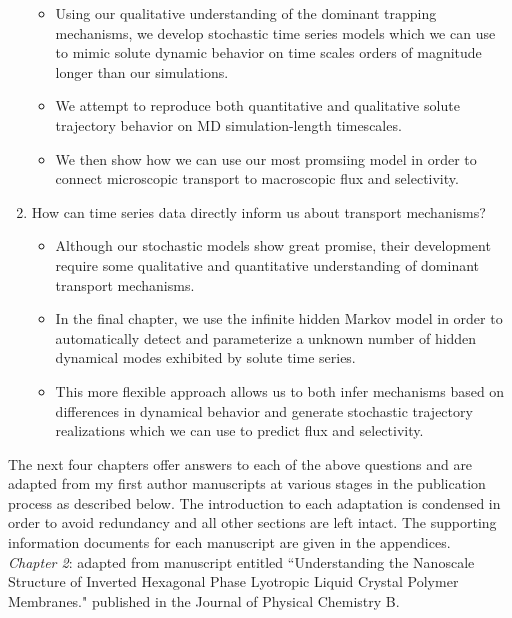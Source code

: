 \begin{enumerate}
\begin{itemize}
    	  \item Using our qualitative understanding of the dominant trapping mechanisms,
    	  we develop stochastic time series models which we can use to mimic solute dynamic
    	  behavior on time scales orders of magnitude longer than our simulations. 
    	  \item We attempt to reproduce both quantitative and qualitative solute trajectory
    	  behavior on MD simulation-length timescales.
    	  \item We then show how we can use our most promsiing model in order to connect 
    	  microscopic transport to macroscopic flux and selectivity.
    	\end{itemize}

    \item How can time series data directly inform us about transport mechanisms?
    	\begin{itemize}
    	  \item Although our stochastic models show great promise, their development 
    	  require some qualitative and quantitative understanding of dominant transport
    	  mechanisms.
    	  \item In the final chapter, we use the infinite hidden Markov model in order
    	  to automatically detect and parameterize a unknown number of hidden dynamical modes
    	  exhibited by solute time series. 
    	  \item This more flexible approach allows us to both infer mechanisms based 
    	  on differences in dynamical behavior and generate stochastic trajectory realizations
    	  which we can use to predict flux and selectivity. 
    	\end{itemize}
  \end{enumerate} 
  
  The next four chapters offer answers to each of the above questions and are adapted from 
  my first author manuscripts at various stages in the publication process as described
  below. The introduction to each adaptation is condensed in order to avoid redundancy and 
  all other sections are left intact. The supporting information documents for each manuscript are
  given in the appendices. \\
  
  \noindent\textit{Chapter 2}: adapted from manuscript entitled ``Understanding the 
  Nanoscale Structure of Inverted Hexagonal Phase Lyotropic Liquid Crystal Polymer Membranes." 
  published in the Journal of Physical Chemistry B.~\cite{coscia_understanding_2019} \\

